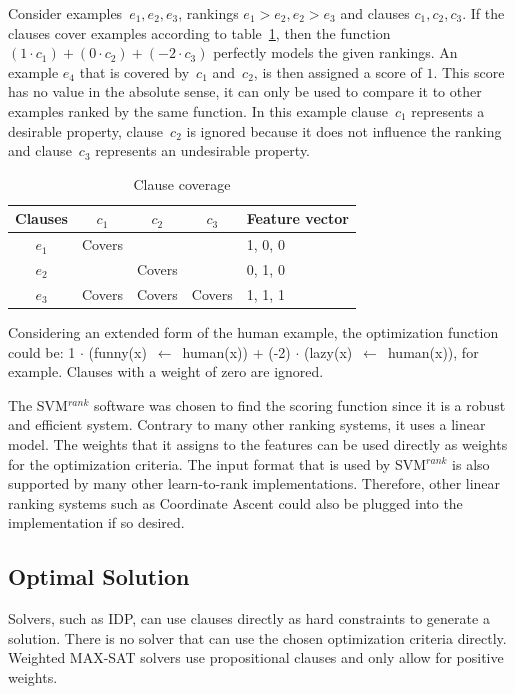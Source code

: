 \documentclass{llncs}
\newcommand{\svm}{SVM$^{rank}$}
\begin{document}
\begin{example}
  Consider examples~$e_1, e_2, e_3$, rankings $e_1 > e_2, e_2 > e_3$ and clauses $c_1, c_2, c_3$.
  If the clauses cover examples according to table~\ref{tbl:cover_examples}, then the function $(1 \cdot c_1) + (0\cdot c_2) + (-2\cdot c_3)$ perfectly models the given rankings.
  An example $e_4$ that is covered by~$c_1$ and~$c_2$, is then assigned a score of $1$.
  This score has no value in the absolute sense, it can only be used to compare it to other examples ranked by the same function.
  In this example clause~$c_1$ represents a desirable property, clause~$c_2$ is ignored because it does not influence the ranking and clause~$c_3$ represents an undesirable property.

  \begin{table}[!htp]
  \caption{Clause coverage}
  \label{tbl:cover_examples}
  \begin{tabularx}{\textwidth}{c|ccc|X}
    \textbf{Clauses}  &$c_1$    & $c_2$   & $c_3$   & \textbf{Feature vector}\\
    \toprule
    $e_1$         & Covers  &       &       & 1, 0, 0\\
    $e_2$         &       & Covers  &       & 0, 1, 0\\
    $e_3$         & Covers  & Covers  & Covers  & 1, 1, 1\\
  \end{tabularx}
  \end{table}

  Considering an extended form of the human example, the optimization function could be:
  1 $\cdot$ (funny(x)~$\leftarrow$~human(x)) + (-2) $\cdot$ (lazy(x)~$\leftarrow$~human(x)), for example.
  Clauses with a weight of zero are ignored.
\end{example}

The \svm{} software was chosen to find the scoring function since it is a robust and efficient system.
Contrary to many other ranking systems, it uses a linear model.
The weights that it assigns to the features can be used directly as weights for the optimization criteria.
The input format that is used by \svm{} is also supported by many other learn-to-rank implementations.
Therefore, other linear ranking systems such as Coordinate Ascent \cite{metzler2007linear} could also be plugged into the implementation if so desired.

\subsection{Optimal Solution}
Solvers, such as IDP, can use clauses directly as hard constraints to generate a solution.
There is no solver that can use the chosen optimization criteria directly.
Weighted MAX-SAT solvers use propositional clauses and only allow for positive weights.
\end{document}
